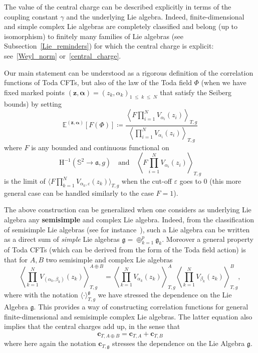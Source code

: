 \documentclass[AHL,Unicode,longabstracts,published]{cedram}
\renewcommand{\leq}{\;\leqslant\;}
\newcommand{\frkg}{\mathfrak{g}}
\newcommand{\frka}{\mathfrak{a}}
\newcommand{\rmH}{\mathrm{H}}
\renewcommand*\S{\mathbb{S}}
\newcommand{\E}{\mathbb{E}}
\newcommand{\ps}[1]{\langle #1 \rangle}
\newcommand*\eps{\varepsilon}
\newcommand*\green[1]{#1}
\begin{document}
The value of the central charge can be described explicitly in terms of the coupling constant $\gamma$ and the underlying Lie algebra. Indeed, finite-dimensional and simple complex Lie algebras are completely classified and belong (up to isomorphism) to finitely many families of Lie algebras (see Subsection~\ref{Lie_reminders}) for which the central charge is explicit: see~\eqref{Weyl_norm} or~\eqref{central_charge}.

Our main statement can be understood as a rigorous definition of the correlation functions of Toda CFTs, but also of the law of the Toda field $\green\Phi$ (when we have fixed marked points $(\bm z, \bm \alpha)=(z_k,\alpha_k)_{1 \leq k \leq N}$ that satisfy the Seiberg bounds) by setting
\begin{equation}
\E^{(\bm z,\bm \alpha)}\left[F(\green\Phi)\right]\coloneqq \frac{\left\langle F\prod\limits_{i=1}^NV_{\alpha_i}(z_i)\right\rangle_{T,g}}{\left\langle \prod\limits_{i=1}^NV_{\alpha_i}(z_i)\right\rangle_{T,g}}
\end{equation}
where $F$ is any bounded and continuous functional on
\[
\rmH^{-1}\left(\S^2\to\frka,g\right)
 \quad\text{and}\quad \left\langle F\prod_{i=1}^NV_{\alpha_i}(z_i)\right\rangle_{T,g}
\]
is the limit of $\langle F \prod_{k=1}^NV_{\alpha_k,\eps}(z_k)\rangle_{T,g} $ when the cut-off $\eps$ goes to $0$ (this more general case can be handled similarly to the case $F=1$).

\begin{rema}
The above construction can be generalized when one considers as underlying Lie algebra any {\bf semisimple} and complex Lie algebra. Indeed, from the classification of semisimple Lie algebras (see for instance~\cite{Hum72}), such a Lie algebra can be written as a direct sum of \emph{simple} Lie algebras $\frkg=\oplus_{k=1}^p \frkg_k$. Moreover a general property of Toda CFTs (which can be derived from the form of the Toda field action) is that for $A,B$ two semisimple and complex Lie algebras
\begin{equation}
\left\langle\prod_{k=1}^NV_{(\alpha_k,\beta_k)}(z_k)\right\rangle_{T, g}^{A\oplus B}=\left\langle\prod_{k=1}^NV_{\alpha_k}(z_k)\right\rangle_{T,g}^A\left\langle\prod_{k=1}^NV_{\beta_k}(z_k)\right\rangle_{T,g}^B,
\end{equation}
where with the notation $\ps{\cdot}_{T, g}^{\frkg}$ we have stressed the dependence on the Lie Algebra $\frkg$. This provides a way of constructing correlation functions for general finite-dimensional and semisimple complex Lie algebras. The latter equation also implies that the central charges add up, in the sense that
\begin{equation}
\bm c_{T,A\oplus B}=\bm c_{T,A}+\bm c_{T,B}
\end{equation}
where here again the notation $ \bm c_{T,\frkg}$ stresses the dependence on the Lie Algebra $\frkg$.
\end{rema}
\end{document}
